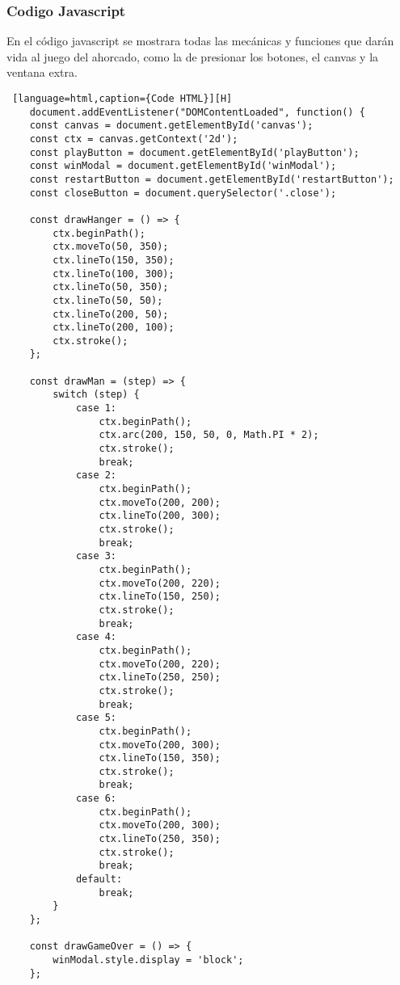 \documentclass[14pt]{article}
\begin{document}
    \subsubsection{Codigo Javascript}
    En el código javascript se mostrara todas las mecánicas y funciones que darán vida al juego del ahorcado, como la de presionar los botones, el canvas y la ventana extra.
    \begin{lstlisting} [language=html,caption={Code HTML}][H]
    document.addEventListener("DOMContentLoaded", function() {
    const canvas = document.getElementById('canvas');
    const ctx = canvas.getContext('2d');
    const playButton = document.getElementById('playButton');
    const winModal = document.getElementById('winModal');
    const restartButton = document.getElementById('restartButton');
    const closeButton = document.querySelector('.close');

    const drawHanger = () => {
        ctx.beginPath();
        ctx.moveTo(50, 350);
        ctx.lineTo(150, 350);
        ctx.lineTo(100, 300);
        ctx.lineTo(50, 350);
        ctx.lineTo(50, 50);
        ctx.lineTo(200, 50);
        ctx.lineTo(200, 100);
        ctx.stroke();
    };

    const drawMan = (step) => {
        switch (step) {
            case 1:
                ctx.beginPath();
                ctx.arc(200, 150, 50, 0, Math.PI * 2);
                ctx.stroke();
                break;
            case 2:
                ctx.beginPath();
                ctx.moveTo(200, 200);
                ctx.lineTo(200, 300);
                ctx.stroke();
                break;
            case 3:
                ctx.beginPath();
                ctx.moveTo(200, 220);
                ctx.lineTo(150, 250);
                ctx.stroke();
                break;
            case 4:
                ctx.beginPath();
                ctx.moveTo(200, 220);
                ctx.lineTo(250, 250);
                ctx.stroke();
                break;
            case 5:
                ctx.beginPath();
                ctx.moveTo(200, 300);
                ctx.lineTo(150, 350);
                ctx.stroke();
                break;
            case 6:
                ctx.beginPath();
                ctx.moveTo(200, 300);
                ctx.lineTo(250, 350);
                ctx.stroke();
                break;
            default:
                break;
        }
    };

    const drawGameOver = () => {
        winModal.style.display = 'block';
    };


\end{lstlisting}
\end{document}
